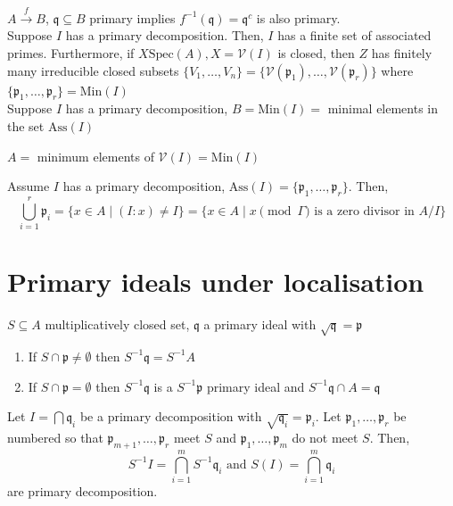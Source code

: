 \documentclass[oneside, 12pt]{scrbook}
\newcommand{\V}{\mathcal{V}}
\newcommand{\spec}{\mathrm{Spec}}
\newcommand{\pr}{\mathfrak{p}}
\theoremstyle{theorem}
\begin{document}
$A \xrightarrow{f} B$, $\mathfrak{q} \subseteq B$ primary implies $f^{-1}(\mathfrak{q})=\mathfrak{q}^c$ is also primary. \\

Suppose $I$ has a primary decomposition. Then, $I$ has a finite set of associated primes. Furthermore, if $X  \spec(A), X = \V(I)$ is closed, then $Z$ has finitely many irreducible closed subsets $\{V_{1}, \hdots , V_{n}\} = \{\V(\pr_{1}), \hdots , \V(\pr_{r})\}$ where $\{\pr_{1}, \hdots , \pr_{r}\}= \mathrm{Min}(I)$ \\
Suppose $I$ has a primary decomposition, $B= \mathrm{Min}(I) = $ minimal elements in the set $\mathrm{Ass}(I)$

\begin{proposition}
$A=$ minimum elements of $\V(I) = \mathrm{Min}(I)$
\end{proposition}

\begin{proposition}
Assume $I$ has a primary decomposition, $\mathrm{Ass}(I)= \{\pr_{1}, \hdots , \pr_{r}\}$. Then, 
\begin{equation*}
\bigcup_{i=1}^r \pr_{i} = \{x\in A \mid (I:x) \neq I\} = \{x \in A \mid x \pmod \Gamma \text{ is a zero divisor in }A/I\}
\end{equation*}
\end{proposition}

\section{Primary ideals under localisation}

\begin{proposition}
$S\subseteq A$ multiplicatively closed set, $\mathfrak{q}$ a primary ideal with $\sqrt{\mathfrak{q}} =\pr$ 
\begin{enumerate}
\item If $S \cap \pr \neq \emptyset$ then $S^{-1}\mathfrak{q} = S^{-1}A$
\item If $S \cap \pr = \emptyset$ then $S^{-1}\mathfrak{q}$ is a $S^{-1}\pr$ primary ideal and $S^{-1}\mathfrak{q} \cap A = \mathfrak{q}$
\end{enumerate}
\end{proposition}

\begin{proposition}
Let $I = \bigcap \mathfrak{q}_{i}$ be a primary decomposition with $\sqrt{\mathfrak{q}_{i}} = \pr_{i}$. Let $\pr_{1}, \hdots , \pr_{r}$ be numbered so that $\pr_{m+1}, \hdots , \pr_{r}$ meet $S$ and $\pr_{1}, \hdots , \pr_{m}$ do not meet $S$. Then, 
\begin{equation}
S^{-1}I = \bigcap_{i=1}^m S^{-1}\mathfrak{q}_{i} \text{ and } S(I)= \bigcap_{i=1}^m \mathfrak{q}_{i}
\end{equation}
are primary decomposition.
\end{proposition}
\end{document}
